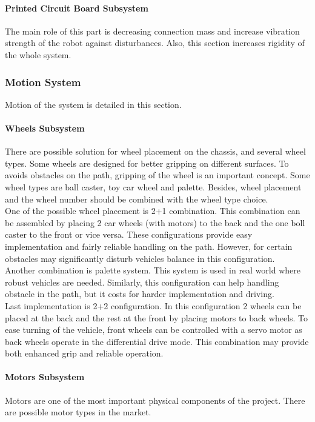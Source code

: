 \documentclass[a4paper,12pt]{article}
\begin{document}
		\paragraph{Printed Circuit Board Subsystem}
			The main role of this part is decreasing connection mass and increase vibration strength of the robot against disturbances. Also, this section increases rigidity of the whole system. 
	
	
	\subsubsection{Motion System}
		Motion of the system is detailed in this section.
		\paragraph{Wheels Subsystem}
			There are possible solution for wheel placement on the chassis, and several wheel types. Some wheels are designed for better gripping on different surfaces. To avoids obstacles on the path, gripping of the wheel is an important concept. Some wheel types are ball caster, toy car wheel and palette. Besides, wheel placement and the wheel number should be combined with the wheel type choice. \\
	
			One of the possible wheel placement is 2+1 combination. This combination can be assembled by placing 2 car wheels (with motors) to the back and the one boll caster to the front or vice versa. These configurations provide easy implementation and fairly reliable handling on the path. However, for certain obstacles may significantly disturb vehicles balance in this configuration.\\

			Another combination is palette system. This system is used in real world where robust vehicles are needed. Similarly, this configuration can help handling obstacle in the path, but it costs for harder implementation and driving.\\

Last implementation is 2+2 configuration. In this configuration 2 wheels can be placed at the back and the rest at the front by placing motors to back wheels. To ease turning of the vehicle, front wheels can be controlled with a servo motor as back wheels operate in the differential drive mode. This combination may provide both enhanced grip and reliable	 operation. \\
		\paragraph{Motors Subsystem}
			Motors are one of the most important physical components of the project. There are possible motor types in the market.\\
\end{document}
